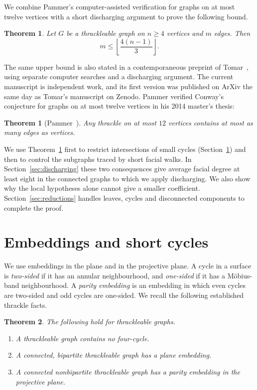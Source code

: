 \documentclass[11pt,a4paper]{article}
\newtheorem{theorem}{Theorem}
\newtheorem{pammertheorem}{Theorem}
\begin{document}
We combine Pammer's computer-assisted verification for graphs on at most
twelve vertices with a short discharging argument to prove the following
bound.

\begin{theorem}\label{thm:1}
Let $G$ be a thrackleable graph on $n\ge4$ vertices and $m$ edges. Then
\[
 m\le\left\lfloor\frac{4(n-1)}3\right\rfloor .
\]
\end{theorem}

The same upper bound is also stated in a contemporaneous
preprint of Tomar~\cite{Tomar}, using separate computer searches
and a discharging argument. The current manuscript is independent work, and its first version was published on ArXiv the same day as Tomar's manuscript on Zenodo. 
Pammer verified Conway's conjecture for graphs
on at most twelve vertices in his 2014 master's thesis:

\begin{pammertheorem}[Pammer~{\cite[Observation~5.16, p.~54]{Pammer2014}}]
\label{thm:pammer}
Any thrackle on at most $12$ vertices contains at most as many edges as
vertices.
\end{pammertheorem}

We use Theorem~\ref{thm:pammer} first to restrict intersections of small
cycles (Section~\ref{sec:definitions}) and then to control the subgraphs
traced by short facial walks. In Section~\ref{sec:discharging} these
two consequences give average facial degree at least eight in the
connected graphs to which we apply discharging. We also show why the
local hypotheses alone cannot give a smaller coefficient.
Section~\ref{sec:reductions} handles leaves, cycles and disconnected
components to complete the proof.

\section{Embeddings and short cycles}\label{sec:definitions}

We use embeddings in the plane and in the projective plane. A cycle in
a surface is \emph{two-sided} if it has an annular neighbourhood, and
\emph{one-sided} if it has a M\"obius-band neighbourhood. A
\emph{parity embedding} is an embedding in which even cycles are
two-sided and odd cycles are one-sided. We recall the following
established thrackle facts.

\begin{theorem}\label{thm:2}
The following hold for thrackleable graphs.
\begin{enumerate}[label=\textup{(\roman*)}]
\item\label{fact:C4} A thrackleable graph contains no four-cycle.
\item\label{fact:plane} A connected, bipartite thrackleable graph has a
plane embedding.
\item\label{fact:parity} A connected nonbipartite thrackleable graph has
a parity embedding in the projective plane.
\end{enumerate}
\end{theorem}
\end{document}

